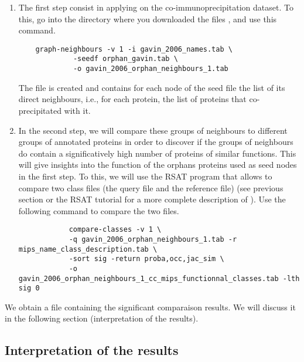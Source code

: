 \begin{enumerate}

\item The first step consist in applying  on the co-immunoprecipitation dataset. To this, go into the
directory where you downloaded the files ,  and use this command.
	
	{\color{Blue} \begin{footnotesize} 
		\begin{verbatim}
	graph-neighbours -v 1 -i gavin_2006_names.tab \ 
			 -seedf orphan_gavin.tab \
			 -o gavin_2006_orphan_neighbours_1.tab
		\end{verbatim} \end{footnotesize}
	}		
The file  is created and contains for each node of the seed file the list of its direct neighbours, i.e., for each protein, the list of proteins that co-precipitated with it.

\item In the second step, we will compare these groups of neighbours to different groups of annotated proteins in order to discover if the groups of neighbours do contain a significatively high number of proteins of similar functions. This will give insights into the function of the orphans proteins used as seed nodes in the first step. To this, we will use the RSAT  program that allows to compare two class
files (the query file and the reference file) (see previous section or the RSAT tutorial for a more complete description of ). Use the following command to compare the two files.
	
	{\color{Blue} \begin{footnotesize} 
		\begin{verbatim}
			compare-classes -v 1 \
			-q gavin_2006_orphan_neighbours_1.tab -r mips_name_class_description.tab \
			-sort sig -return proba,occ,jac_sim \
			-o gavin_2006_orphan_neighbours_1_cc_mips_functionnal_classes.tab -lth sig 0
		\end{verbatim} \end{footnotesize}
	}
\end{enumerate}
We obtain a file  containing the significant comparaison results. We will discuss it in the following section (interpretation of the results).

\subsection{Interpretation of the results}

